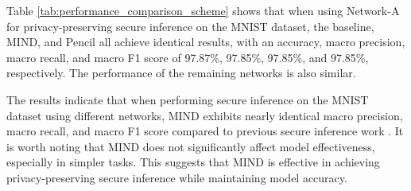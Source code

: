 \documentclass[conference]{IEEEtran}
\begin{document}
Table \ref{tab:performance_comparison_scheme} shows that when using Network-A for privacy-preserving secure inference on the MNIST dataset, the baseline, MIND, and Pencil all achieve identical results, with an accuracy, macro precision, macro recall, and macro F1 score of 97.87\%, 97.85\%, 97.85\%, and 97.85\%, respectively. The performance of the remaining networks is also similar.


The results indicate that when performing secure inference on the MNIST dataset using different networks, MIND exhibits nearly identical macro precision, macro recall, and macro F1 score compared to previous secure inference work \cite{liu2024pencilprivateextensiblecollaborative}.
It is worth noting that MIND does not significantly affect model effectiveness, especially in simpler tasks. 
This suggests that MIND is effective in achieving privacy-preserving secure inference while maintaining model accuracy.
\end{document}
